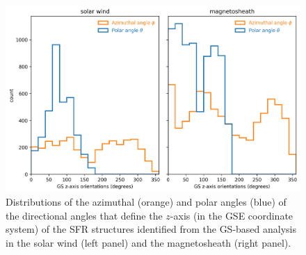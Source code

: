 \begin{figure}
    \centering
    \includegraphics[width=\textwidth]{Figures/Histograms/histogram_orientation.png}
    \caption[Distributions of the azimuthal  and polar angles that define the $z$-axis of SFR structures]{Distributions of the azimuthal (orange) and polar angles (blue) of the directional angles that define the $z$-axis (in the GSE coordinate system) of the SFR structures identified from the GS-based analysis in the solar wind (left panel) and the magnetosheath (right panel).}
    \label{fig:histogram-orientation}
\end{figure}
